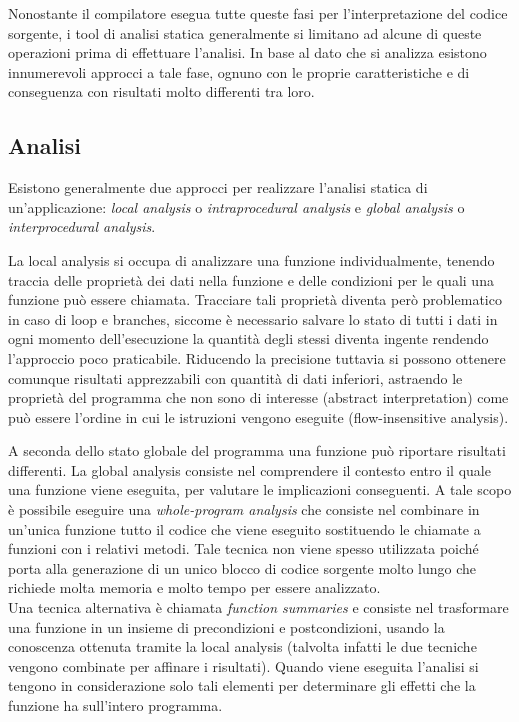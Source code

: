 Nonostante il compilatore esegua tutte queste fasi per l'interpretazione del codice sorgente, i tool di analisi statica generalmente si limitano ad alcune di queste operazioni prima di effettuare l'analisi. In base al dato che si analizza esistono innumerevoli approcci a tale fase, ognuno con le proprie caratteristiche e di conseguenza con risultati molto differenti tra loro.

\subsection{Analisi}
Esistono generalmente due approcci per realizzare l'analisi statica di un'applicazione: \emph{local analysis} o \emph{intraprocedural analysis} e \emph{global analysis} o \emph{interprocedural analysis}.

La local analysis si occupa di analizzare una funzione individualmente, tenendo traccia delle proprietà dei dati nella funzione e delle condizioni per le quali una funzione può essere chiamata. Tracciare tali proprietà diventa però problematico in caso di loop e branches, siccome è necessario salvare lo stato di tutti i dati in ogni momento dell'esecuzione la quantità degli stessi diventa ingente rendendo l'approccio poco praticabile. Riducendo la precisione tuttavia si possono ottenere comunque risultati apprezzabili con quantità di dati inferiori, astraendo le proprietà del programma che non sono di interesse (abstract interpretation) come può essere l'ordine in cui le istruzioni vengono eseguite (flow-insensitive analysis).

A seconda dello stato globale del programma una funzione può riportare risultati differenti. La global analysis consiste nel comprendere il contesto entro il quale una funzione viene eseguita, per valutare le implicazioni conseguenti. A tale scopo è possibile eseguire una \emph{whole-program analysis} che consiste nel combinare in un'unica funzione tutto il codice che viene eseguito sostituendo le chiamate a funzioni con i relativi metodi. Tale tecnica non viene spesso utilizzata poiché porta alla generazione di un unico blocco di codice sorgente molto lungo che richiede molta memoria e molto tempo per essere analizzato.\\
Una tecnica alternativa è chiamata \emph{function summaries} e consiste nel trasformare una funzione in un insieme di precondizioni e postcondizioni, usando la conoscenza ottenuta tramite la local analysis (talvolta infatti le due tecniche vengono combinate per affinare i risultati). Quando viene eseguita l'analisi si tengono in considerazione solo tali elementi per determinare gli effetti che la funzione ha sull'intero programma. 

